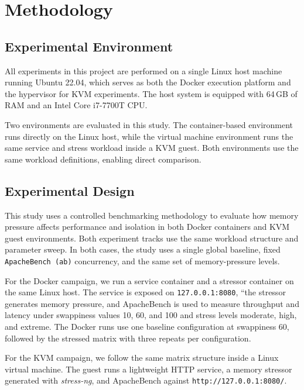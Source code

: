 \documentclass[conference]{IEEEtran}
\begin{document}
\section{Methodology}
\subsection{Experimental Environment}
All experiments in this project are performed on a single Linux host machine running Ubuntu 22.04, which serves as both the Docker execution platform and the hypervisor for KVM experiments. The host system is equipped with 64\,GB of RAM and an Intel Core i7-7700T CPU.


Two environments are evaluated in this study. The container-based environment runs directly on the Linux host, while the virtual machine environment runs the same service and stress workload inside a KVM guest. Both environments use the same workload definitions, enabling direct comparison.

\subsection{Experimental Design}
This study uses a controlled benchmarking methodology to evaluate how memory pressure affects performance and isolation in both Docker containers and KVM guest environments. Both experiment tracks use the same workload structure and parameter sweep. In both cases, the study uses a single global baseline, fixed \texttt{ApacheBench (ab)} \cite{apachebench} concurrency, and the same set of memory-pressure levels.

For the Docker \cite{merkel2014docker} campaign, we run a service container and a stressor container on the same Linux host. The service is exposed on \texttt{127.0.0.1:8080}, “the stressor generates memory pressure, and ApacheBench is used to measure throughput and latency under swappiness values 10, 60, and 100 and stress levels moderate, high, and extreme. The Docker runs use one baseline configuration at swappiness 60, followed by the stressed matrix with three repeats per configuration. 


For the KVM \cite{kivity2007kvm} campaign, we follow the same matrix structure inside a Linux virtual machine. The guest runs a lightweight HTTP service, a memory stressor generated with \textit{stress-ng}, and ApacheBench against \texttt{http://127.0.0.1:8080/}. 
\end{document}

